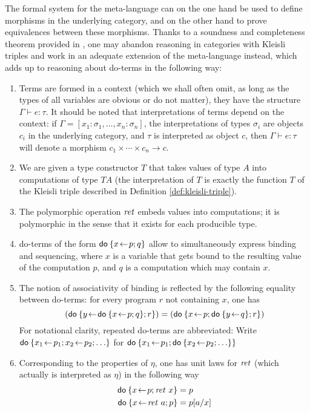 The formal system for the meta-language can on the one hand be used to define
morphisms in the underlying category, and on the other hand to prove
equivalences between these morphisms. Thanks to a soundness and completeness
theorem provided in \cite{Moggi91}, one may abandon reasoning in categories with
Kleisli triples and work in an adequate extension of the meta-language instead,
which adds up to reasoning about do-terms in the following way:
\begin{enumerate}
\item Terms are formed in a context (which we shall often omit, as long as the
  types of all variables are obvious or do not matter), \IE they have the
  structure $\Gamma \vdash e : \tau$. It should be noted that interpretations of terms depend
  on the context: if $\Gamma = [x_1 : \sigma_1, \ldots, x_n : \sigma_n]$, the interpretations of
  types $\sigma_i$ are objects $c_i$ in the underlying category, and  $\tau$ is
  interpreted as object $c$, then $\Gamma \vdash e : \tau$ will denote a morphism $c_1 \times \cdots \times
  c_n \to c$.

\item We are given a type constructor $T$ that takes values of type $A$ into
  computations of type $T A$ (the interpretation of $T$ is exactly the function
  $T$ of the Kleisli triple described in Definition \ref{def:kleisli-triple}).
  
\item The polymorphic operation $\mathit{ret}$ embeds values into computations; it is
  polymorphic in the sense that it exists for each producible type.
  
\item do-terms of the form $\mathsf{do}\: \{x\!\gets\! p; q\}$ allow to simultaneously
  express binding and sequencing, where $x$ is a variable that gets bound to the
  resulting value of the computation $p$, and $q$ is a computation which may
  contain $x$.
  
\item The notion of associativity of binding is reflected by the following
  equality between do-terms: for every program $r$ not containing $x$, one has
  \[
  (\DoStmt{y\leteq \DoStmt{x\leteq p; q}; r}) = (\DoStmt{x\leteq p;
    \DoStmt{y\leteq q}; r})
  \]
  For notational clarity, repeated do-terms are abbreviated: Write $\mathsf{do}\: \{x_1\!\gets\!
    p_1; x_2\!\gets\! p_2; \ldots\}$ for $\mathsf{do}\: \{x_1\!\gets\! p_1; \mathsf{do}\: \{x_2\!\gets\! p_2; \ldots\}\}$
  
\item Corresponding to the properties of $\eta$, one has unit laws for $\mathit{ret}$
  (which actually is interpreted as $\eta$) in the following way
  \begin{align*}
    \mathsf{do}\: \{x\!\gets\! p; \mathit{ret}~x\} &= p \\
    \mathsf{do}\: \{x\!\gets\! \mathit{ret}~a; p\} &= p[a/x] \\
  \end{align*}
  

\end{enumerate}

